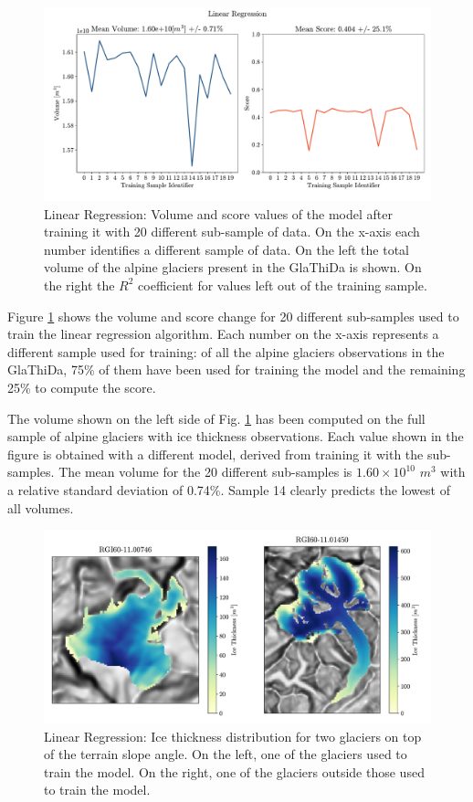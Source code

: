 \begin{figure}[!tp]
	\centering		  
	\includegraphics[width=1.\textwidth]{figures/LR_score.pdf}
	\caption{Linear Regression: Volume and score values of the model after training it with 20 different sub-sample of data. On the x-axis each number identifies a different sample of data. On the left the total volume of the alpine glaciers present in the GlaThiDa is shown. On the right the $R^2$ coefficient for values left out of the training sample.}
	\label{fig:lr-score}
\end{figure}

Figure \ref{fig:lr-score} shows the volume and score change  for 20 different sub-samples used to train the linear regression algorithm. Each number on the x-axis represents a different sample used for training: of all the alpine glaciers observations in the GlaThiDa, 75\% of them have been used for  training the model and the remaining 25\% to compute the score. 

The volume shown on the left side of Fig. \ref{fig:lr-score} has been computed on the full sample of alpine glaciers with ice thickness observations. Each value shown in the figure is obtained with a different model, derived from training it with the sub-samples. The mean volume for the 20 different sub-samples is $1.60\times 10^{10}$ $m^3$ with a relative standard deviation of 0.74\%. Sample 14 clearly predicts the lowest of all volumes.

\begin{figure}[!tp]
	\centering		  
	\includegraphics[width=1.\textwidth]{figures/LR_thick_map.pdf}
	\caption{Linear Regression: Ice thickness distribution for two glaciers on top of the terrain slope angle. On the left, one of the glaciers used to train the model. On the right, one of the glaciers outside those used to train the model.}
	\label{fig:lr-map}
\end{figure}

